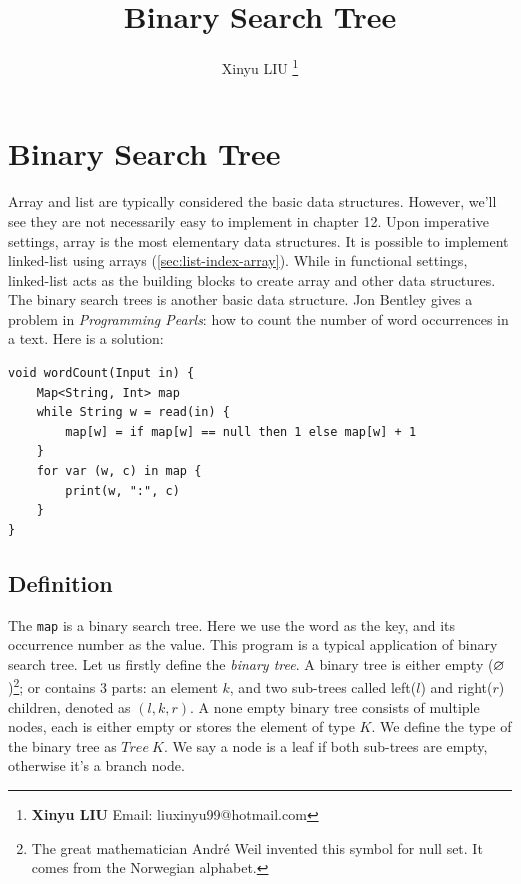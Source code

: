 \documentclass[b5paper]{article}
\begin{document}
\title{Binary Search Tree}

\author{Xinyu LIU
\thanks{{\bfseries Xinyu LIU} \newline
  Email: liuxinyu99@hotmail.com \newline}
  }

\maketitle
\fi


\ifx\wholebook\relax
\chapter{Binary Search Tree}
\fi

Array and list are typically considered the basic data structures. However, we'll see they are not necessarily easy to implement in chapter 12. Upon imperative settings, array is the most elementary data structures. It is possible to implement linked-list using arrays (\cref{sec:list-index-array}). While in functional settings, linked-list acts as the building blocks to create array and other data structures. The binary search trees is another basic data structure. Jon Bentley gives a problem in {\em Programming Pearls}\cite{Bentley}: how to count the number of word occurrences in a text. Here is a solution:

\lstset{frame=single}
\begin{lstlisting}[language=Bourbaki]
void wordCount(Input in) {
    Map<String, Int> map
    while String w = read(in) {
        map[w] = if map[w] == null then 1 else map[w] + 1
    }
    for var (w, c) in map {
        print(w, ":", c)
    }
}
\end{lstlisting}

\section{Definition}
\label{introduction} 

The \texttt{map} is a binary search tree. Here we use the word as the key, and its occurrence number as the value. This program is a typical application of binary search tree. Let us firstly define the {\em binary tree}. A binary tree is either empty ($\varnothing$)\footnote{The great mathematician André Weil invented this symbol for null set. It comes from the Norwegian alphabet.}; or contains 3 parts: an element $k$, and two sub-trees called left($l$) and right($r$) children, denoted as $(l, k, r)$. A none empty binary tree consists of multiple nodes, each is either empty or stores the element of type $K$. We define the type of the binary tree as $Tree\ K$. We say a node is a leaf if both sub-trees are empty, otherwise it's a branch node.
\end{document}
